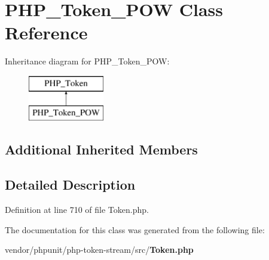 \section{P\+H\+P\+\_\+\+Token\+\_\+\+P\+O\+W Class Reference}
\label{class_p_h_p___token___p_o_w}
Inheritance diagram for P\+H\+P\+\_\+\+Token\+\_\+\+P\+O\+W\+:\begin{figure}[H]
\begin{center}
\leavevmode
\includegraphics[height=2.000000cm]{class_p_h_p___token___p_o_w}
\end{center}
\end{figure}
\subsection*{Additional Inherited Members}


\subsection{Detailed Description}


Definition at line 710 of file Token.\+php.



The documentation for this class was generated from the following file\+:\begin{DoxyCompactItemize}
\item 
vendor/phpunit/php-\/token-\/stream/src/{\bf Token.\+php}\end{DoxyCompactItemize}

